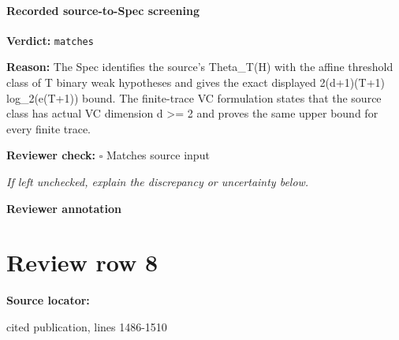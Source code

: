 \documentclass[10pt]{article}
\newcommand{\reviewerbox}{%
  \par\noindent\fbox{\parbox{0.96\linewidth}{\rule{0pt}{0.38in}}}\par
}
\newcommand{\reviewmatch}[1]{%
  \par\noindent\textbf{Reviewer check:} $\square$\; #1\par
  \noindent\emph{If left unchecked, explain the discrepancy or uncertainty below.}\par
}
\begin{document}
\paragraph{Recorded source-to-Spec screening}
\textbf{Verdict:} \texttt{matches}
\\
{\raggedright
\textbf{Reason:} The Spec identifies the source's Theta\_\allowbreak{}T(H) with the affine threshold class of T binary weak hypotheses and gives the exact displayed 2(d+1)(T+1) log\_\allowbreak{}2(e(T+1)) bound.\allowbreak{} The finite-\allowbreak{}trace VC formulation states that the source class has actual VC dimension d >= 2 and proves the same upper bound for every finite trace.\allowbreak{}
\par}
\reviewmatch{Matches source input}
\noindent\textbf{Reviewer annotation}\par
\reviewerbox
\clearpage
\hypertarget{source-claim-a54b1bc46151ef0b}{}
\section*{Review row 8}
\textbf{Source locator:} {\footnotesize\raggedright cited publication, lines 1486-\allowbreak{}1510\par}
\end{document}
